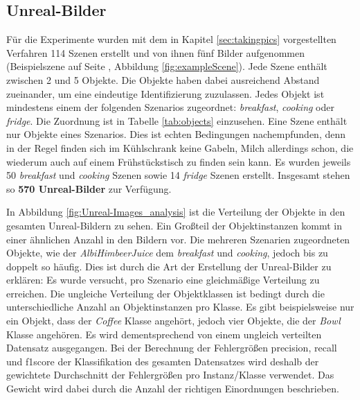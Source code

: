 \subsection{Unreal-Bilder}  
Für die Experimente wurden mit dem in Kapitel \ref{sec:takingpics} vorgestellten Verfahren 114 Szenen erstellt und von ihnen fünf Bilder aufgenommen (Beispielszene auf Seite \pageref{fig:exampleScene}, Abbildung \ref{fig:exampleScene}). Jede Szene enthält zwischen 2 und 5 Objekte. Die Objekte haben dabei ausreichend Abstand zueinander, um eine eindeutige Identifizierung zuzulassen. Jedes Objekt ist mindestens einem der folgenden Szenarios zugeordnet: \textit{breakfast}, \textit{cooking} oder \textit{fridge}. Die Zuordnung ist in Tabelle \ref{tab:objects} einzusehen. Eine Szene enthält nur Objekte eines Szenarios. Dies ist echten Bedingungen nachempfunden, denn in der Regel finden sich im Kühlschrank keine Gabeln, Milch allerdings schon, die wiederum auch auf einem Frühstückstisch zu finden sein kann. Es wurden jeweils 50 \textit{breakfast} und \textit{cooking} Szenen sowie 14 \textit{fridge} Szenen erstellt. Insgesamt stehen so \textbf{570 Unreal-Bilder} zur Verfügung. \par

In Abbildung \ref{fig:Unreal-Images_analysis} ist die Verteilung der Objekte in den gesamten Unreal-Bildern zu sehen. Ein Großteil der Objektinstanzen kommt in einer ähnlichen Anzahl in den Bildern vor. Die mehreren Szenarien zugeordneten Objekte, wie der \textit{AlbiHimbeerJuice} dem \textit{breakfast} und \textit{cooking}, jedoch bis zu doppelt so häufig. Dies ist durch die Art der Erstellung der Unreal-Bilder zu erklären: Es wurde versucht, pro Szenario eine gleichmäßige Verteilung zu erreichen. \newline
Die ungleiche Verteilung der Objektklassen ist bedingt durch die unterschiedliche Anzahl an Objektinstanzen pro Klasse. Es gibt beispielsweise nur ein Objekt, dass der \textit{Coffee} Klasse angehört, jedoch vier Objekte, die der \textit{Bowl} Klasse angehören. \newline
Es wird dementsprechend von einem ungleich verteilten Datensatz ausgegangen. Bei der Berechnung der Fehlergrößen \gls{precision}, \gls{recall} und \gls{f1score} der Klassifikation des gesamten Datensatzes wird deshalb der gewichtete Durchschnitt der Fehlergrößen pro Instanz/Klasse verwendet. Das Gewicht wird dabei durch die Anzahl der richtigen Einordnungen beschrieben. \par


